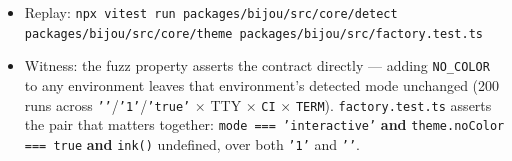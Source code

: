 \begin{itemize}
\item
  Replay: \texttt{n\allowbreak{}p\allowbreak{}x\allowbreak{} \allowbreak{}v\allowbreak{}i\allowbreak{}t\allowbreak{}e\allowbreak{}s\allowbreak{}t\allowbreak{} \allowbreak{}r\allowbreak{}u\allowbreak{}n\allowbreak{} \allowbreak{}p\allowbreak{}a\allowbreak{}c\allowbreak{}k\allowbreak{}a\allowbreak{}g\allowbreak{}e\allowbreak{}s\allowbreak{}/\allowbreak{}b\allowbreak{}i\allowbreak{}j\allowbreak{}o\allowbreak{}u\allowbreak{}/\allowbreak{}s\allowbreak{}r\allowbreak{}c\allowbreak{}/\allowbreak{}c\allowbreak{}o\allowbreak{}r\allowbreak{}e\allowbreak{}/\allowbreak{}d\allowbreak{}e\allowbreak{}t\allowbreak{}e\allowbreak{}c\allowbreak{}t\allowbreak{} \allowbreak{}p\allowbreak{}a\allowbreak{}c\allowbreak{}k\allowbreak{}a\allowbreak{}g\allowbreak{}e\allowbreak{}s\allowbreak{}/\allowbreak{}b\allowbreak{}i\allowbreak{}j\allowbreak{}o\allowbreak{}u\allowbreak{}/\allowbreak{}s\allowbreak{}r\allowbreak{}c\allowbreak{}/\allowbreak{}c\allowbreak{}o\allowbreak{}r\allowbreak{}e\allowbreak{}/\allowbreak{}t\allowbreak{}h\allowbreak{}e\allowbreak{}m\allowbreak{}e\allowbreak{} \allowbreak{}p\allowbreak{}a\allowbreak{}c\allowbreak{}k\allowbreak{}a\allowbreak{}g\allowbreak{}e\allowbreak{}s\allowbreak{}/\allowbreak{}b\allowbreak{}i\allowbreak{}j\allowbreak{}o\allowbreak{}u\allowbreak{}/\allowbreak{}s\allowbreak{}r\allowbreak{}c\allowbreak{}/\allowbreak{}f\allowbreak{}a\allowbreak{}c\allowbreak{}t\allowbreak{}o\allowbreak{}r\allowbreak{}y\allowbreak{}.\allowbreak{}t\allowbreak{}e\allowbreak{}s\allowbreak{}t\allowbreak{}.\allowbreak{}t\allowbreak{}s}
\item
  Witness: the fuzz property asserts the contract directly --- adding \texttt{N\allowbreak{}O\allowbreak{}\_\allowbreak{}C\allowbreak{}O\allowbreak{}L\allowbreak{}O\allowbreak{}R} to any environment leaves that environment's detected mode unchanged (200 runs across \texttt{'\allowbreak{}'}/\texttt{'\allowbreak{}1\allowbreak{}'}/\texttt{'\allowbreak{}t\allowbreak{}r\allowbreak{}u\allowbreak{}e\allowbreak{}'} × TTY × \texttt{C\allowbreak{}I} × \texttt{T\allowbreak{}E\allowbreak{}R\allowbreak{}M}). \texttt{f\allowbreak{}a\allowbreak{}c\allowbreak{}t\allowbreak{}o\allowbreak{}r\allowbreak{}y\allowbreak{}.\allowbreak{}t\allowbreak{}e\allowbreak{}s\allowbreak{}t\allowbreak{}.\allowbreak{}t\allowbreak{}s} asserts the pair that matters together: \texttt{m\allowbreak{}o\allowbreak{}d\allowbreak{}e\allowbreak{} \allowbreak{}=\allowbreak{}=\allowbreak{}=\allowbreak{} \allowbreak{}'\allowbreak{}i\allowbreak{}n\allowbreak{}t\allowbreak{}e\allowbreak{}r\allowbreak{}a\allowbreak{}c\allowbreak{}t\allowbreak{}i\allowbreak{}v\allowbreak{}e\allowbreak{}'} \textbf{and} \texttt{t\allowbreak{}h\allowbreak{}e\allowbreak{}m\allowbreak{}e\allowbreak{}.\allowbreak{}n\allowbreak{}o\allowbreak{}C\allowbreak{}o\allowbreak{}l\allowbreak{}o\allowbreak{}r\allowbreak{} \allowbreak{}=\allowbreak{}=\allowbreak{}=\allowbreak{} \allowbreak{}t\allowbreak{}r\allowbreak{}u\allowbreak{}e} \textbf{and} \texttt{i\allowbreak{}n\allowbreak{}k\allowbreak{}(\allowbreak{})} undefined, over both \texttt{'\allowbreak{}1\allowbreak{}'} and \texttt{'\allowbreak{}'}.

\end{itemize}
